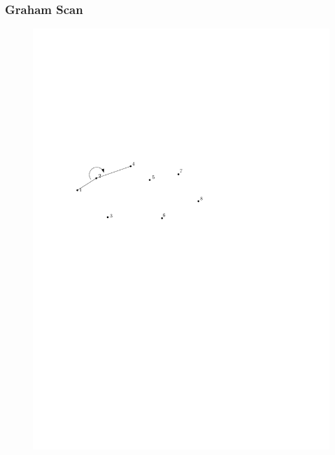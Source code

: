 \begin{frame}
	\frametitle{{Graham Scan}}
\begin{figure}[htbp]
	\begin{center}
  	\includegraphics[width=.8\linewidth]{bilder/graham4}
	\end{center}
\end{figure}
\end{frame}



